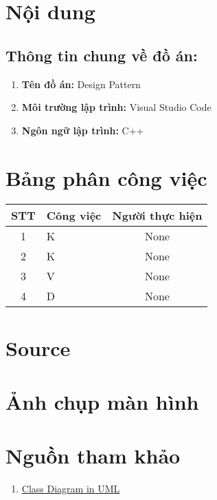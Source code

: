 \documentclass[a4paper,12pt]{report}
\begin{document}
\pagebreak
\section{Nội dung}
\subsection{Thông tin chung về đồ án:}
\begin{enumerate}
  \item \textbf{Tên đồ án:} Design Pattern
  \item \textbf{Môi trường lập trình:} Visual Studio Code
  \item \textbf{Ngôn ngữ lập trình:} C++
\end{enumerate}

\section{Bảng phân công việc}
\begin{center}
  \renewcommand{\arraystretch}{1.5}
  \begin{tabular}{|c|p{}|c|}
    \hline
    \textbf{STT} & \textbf{Công việc} & \textbf{Người thực hiện} \\\hline
    1            & K                  & None                     \\\hline
    2            & K                  & None                     \\\hline
    3            & V                  & None                     \\\hline
    4            & D                  & None                     \\\hline
  \end{tabular}
\end{center}

\pagebreak
\section{Source}

\pagebreak
\section{Ảnh chụp màn hình}

\pagebreak
\section{Nguồn tham khảo}
\begin{enumerate}
  \item \href{https://www.youtube.com/watch?v=oBykLn64AUc}{Class Diagram in UML}
\end{enumerate}
\end{document}
